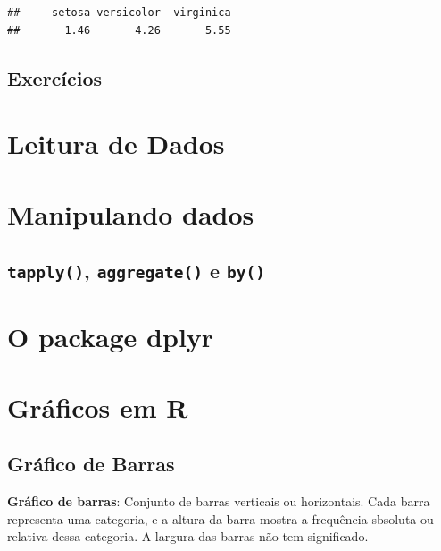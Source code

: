 \documentclass[
]{book}
\begin{document}
\begin{verbatim}
##     setosa versicolor  virginica 
##       1.46       4.26       5.55
\end{verbatim}

\section{Exercícios}\label{exercuxedcios-9}

\chapter{Leitura de Dados}\label{leitura-de-dados}

\chapter{Manipulando dados}\label{manipulando-dados}

\section{\texorpdfstring{\texttt{tapply()}, \texttt{aggregate()} e \texttt{by()}}{tapply(), aggregate() e by()}}\label{tapply-aggregate-e-by}

\chapter{O package dplyr}\label{o-package-dplyr}

\chapter{Gráficos em R}\label{gruxe1ficos-em-r}

\section{Gráfico de Barras}\label{gruxe1fico-de-barras}

\textbf{Gráfico de barras}: Conjunto de barras verticais ou horizontais. Cada barra representa uma categoria, e a altura da barra mostra a frequência sbsoluta ou relativa dessa categoria. A largura das barras não tem significado.
\end{document}
